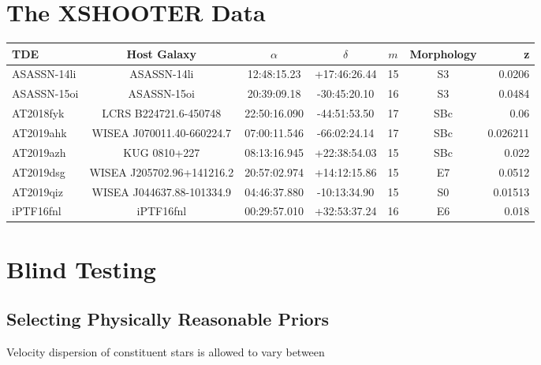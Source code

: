\documentclass[a4paper,11pt]{article}
\begin{document}
\section{The XSHOOTER Data}\label{sec:xshooter_data}

\begin{tabular}{| l | c | c | c | c | c | r |}
  \hline
  TDE         & Host Galaxy               & $\alpha$     & $\delta$     & $m$ & Morphology & z        \\
  \hline
  ASASSN-14li & ASASSN-14li               & 12:48:15.23  & +17:46:26.44 & 15  & S3         & 0.0206   \\
  ASASSN-15oi & ASASSN-15oi               & 20:39:09.18  & -30:45:20.10 & 16  & S3         & 0.0484   \\
  AT2018fyk   & LCRS B224721.6-450748     & 22:50:16.090 & -44:51:53.50 & 17  & SBc        & 0.06     \\
  AT2019ahk   & WISEA J070011.40-660224.7 & 07:00:11.546 & -66:02:24.14 & 17  & SBc        & 0.026211 \\
  AT2019azh   & KUG 0810+227              & 08:13:16.945 & +22:38:54.03 & 15  & SBc        & 0.022    \\
  AT2019dsg   & WISEA J205702.96+141216.2 & 20:57:02.974 & +14:12:15.86 & 15  & E7         & 0.0512   \\
  AT2019qiz   & WISEA J044637.88-101334.9 & 04:46:37.880 & -10:13:34.90 & 15  & S0         & 0.01513  \\
  iPTF16fnl   & iPTF16fnl                 & 00:29:57.010 & +32:53:37.24 & 16  & E6         & 0.018    \\
  \hline
\end{tabular}

\section{Blind Testing}\label{sec:blind_testing}

\subsection{Selecting Physically Reasonable Priors}\label{sec:prior_selection}

Velocity dispersion of constituent stars is allowed to vary between
\end{document}
